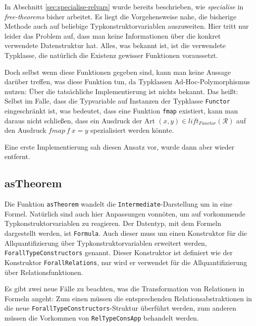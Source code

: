 In Abschnitt \ref{sec:specialise-relvars} wurde bereits beschrieben, wie \textit{specialise} in \textit{free-theorems} bisher arbeitet.
Es liegt die Vorgehensweise nahe, die bisherige Methode auch auf beliebige Typkonstruktorvariablen auszuweiten. Hier tritt nur leider
das Problem auf, dass man keine Informationen über die konkret verwendete Datenstruktur hat. Alles, was bekannt ist, ist die
verwendete Typklasse, die natürlich die Existenz gewisser Funktionen voraussetzt.

Doch selbst wenn diese Funktionen gegeben sind, kann man keine Aussage darüber treffen, was diese Funktion tun, da Typklassen
Ad-Hoc-Polymorphismus nutzen: Über die tatsächliche Implementierung ist nichts bekannt. Das heißt: Selbst im Falle, dass
die Typvariable auf Instanzen der Typklasse \texttt{Functor} eingeschränkt ist, was bedeutet, dass eine Funktion \texttt{fmap}
existiert, kann man daraus nicht schließen, dass ein Ausdruck der Art $(x, y) \in lift_{Functor}(\mathcal{R})$ auf den Ausdruck
$fmap\ f\ x = y$ spezialisiert werden könnte.

Eine erste Implementierung sah diesen Ansatz vor, wurde dann aber wieder entfernt.


\subsection{asTheorem}

Die Funktion \texttt{asTheorem} wandelt die \texttt{Intermediate}-Darstellung um in eine Formel. Natürlich sind auch hier
Anpassungen vonnöten, um auf vorkommende Typkonstruktorvariablen zu reagieren. Der Datentyp, mit dem Formeln
dargestellt werden, ist \texttt{Formula}. Auch dieser muss um einen Konstruktor für die Allquantifizierung über
Typkonstruktorvariablen erweitert werden, \texttt{ForallTypeConstructors} genannt.
Dieser Konstruktor ist definiert wie der Konstruktor \texttt{ForallRelations}, nur wird er verwendet für die Allquantifizierung
über Relationsfunktionen.

Es gibt zwei neue Fälle zu beachten, was die Transformation von Relationen in Formeln angeht: Zum einen müssen die
entsprechenden Relationsabstraktionen in die neue \texttt{ForallTypeConstructors}-Struktur überführt werden, zum anderen
müssen die Vorkommen von \texttt{RelTypeConsApp} behandelt werden.

